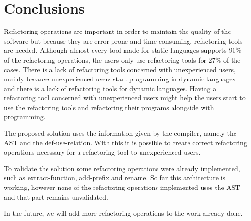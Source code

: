 
% 
% 

\section{Conclusions}


Refactoring operations are important in order to maintain the quality of the software but because they are error prone and time consuming, refactoring tools are needed.
Although almost every tool made for static languages supports 90\% of the refactoring operations, the users only use refactoring tools for 27\% of the cases. 
There is a lack of refactoring tools concerned with unexperienced users, mainly because unexperienced users start programming in dynamic languages and there is a lack of refactoring tools for dynamic languages.
Having a refactoring tool concerned with unexperienced users might help the users start to use the refactoring tools and refactoring their programs alongside with programming.

The proposed solution uses the information given by the compiler, namely the AST and the def-use-relation. With this it is possible to create correct refactoring operations necessary for a refactoring tool to unexperienced users.


To validate the solution some refactoring operations were already implemented, such as extract-function, add-prefix and rename. 
So far this architecture is working, however none of the refactoring operations implemented uses the AST and that part remains unvalidated.

In the future, we will add more refactoring operations to the work already done.







